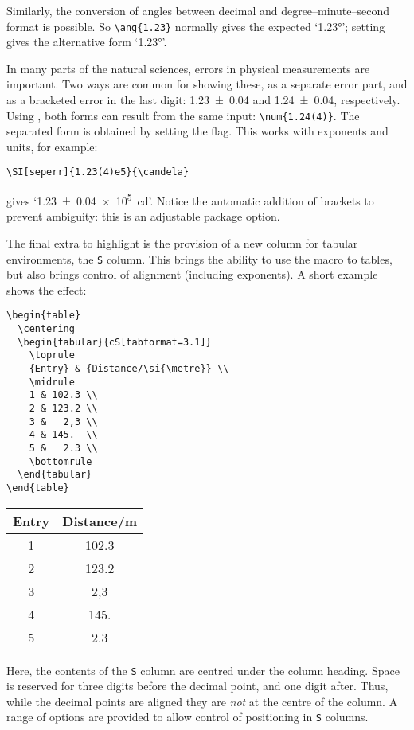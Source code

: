 \begin{bibunit}
Similarly, the conversion of angles between decimal and
degree--minute--second format is possible.  So
\verb|\ang{1.23}| normally gives the expected `\ang{1.23}';
setting  gives the alternative form
`\ang[angformat=arc]{1.23}'.

In many parts of the natural sciences, errors in physical
measurements are important.  Two ways are common for showing
these, as a separate error part, and as a bracketed error in
the last digit: \num[seperr]{1.23(4)} and \num{1.24(4)},
respectively.  Using , both forms can result from
the same input: \verb|\num{1.24(4)}|.  The separated form is
obtained by setting the  flag.  This works with
exponents and units, for example:
\begin{verbatim}
\SI[seperr]{1.23(4)e5}{\candela}
\end{verbatim}
gives `\SI[seperr]{1.23(4)e5}{\candela}'.  Notice the
automatic addition of brackets to prevent ambiguity: this is an
adjustable package option.

The final extra to highlight is the provision of a new column
for tabular environments, the \texttt{S} column.  This brings
the ability to use the  macro to tables, but also
brings control of alignment (including exponents).  A short
example shows the effect:
\begin{verbatim}
\begin{table}
  \centering
  \begin{tabular}{cS[tabformat=3.1]}
    \toprule
    {Entry} & {Distance/\si{\metre}} \\
    \midrule
    1 & 102.3 \\
    2 & 123.2 \\
    3 &   2,3 \\
    4 & 145.  \\
    5 &   2.3 \\
    \bottomrule
  \end{tabular}
\end{table}
\end{verbatim}
\begin{table}
  \centering
  \begin{tabular}{cS[tabformat=3.1]}
    \toprule
    {Entry} & {Distance/\si{\metre}} \\
     & 102.3 \\
    2 & 123.2 \\
    3 &   2,3 \\
    4 & 145.  \\
    5 &   2.3 \\
    \bottomrule
  \end{tabular}
\end{table}
Here, the contents of the \texttt{S} column are centred under
the column heading.  Space is reserved for three digits before
the decimal point, and one digit after.  Thus, while the
decimal points are aligned they are \emph{not} at the centre of
the column.  A range of options are provided to allow control
of positioning in \texttt{S} columns.


\end{bibunit}
